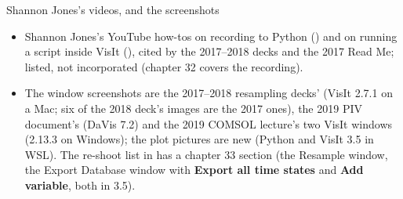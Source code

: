 \documentclass[aspectratio=169,11pt]{beamer}
\newcommand{\gui}[1]{\textsf{\textbf{#1}}}
\begin{document}
\begin{frame}{Shannon Jones's videos, and the screenshots}
\label{fr:screenshots}
\small
\begin{itemize}
  \item Shannon Jones's YouTube how-tos on recording to Python () and on running a script inside VisIt (), cited by the 2017--2018 decks and the 2017 Read Me; listed, not incorporated (chapter 32 covers the recording).
  \item The window screenshots are the 2017--2018 resampling decks' (VisIt 2.7.1 on a Mac; six of the 2018 deck's images are the 2017 ones), the 2019 PIV document's (DaVis 7.2) and the 2019 COMSOL lecture's two VisIt windows (2.13.3 on Windows); the plot pictures are new (Python and VisIt 3.5 in WSL). The re-shoot list in  has a chapter 33 section (the Resample window, the Export Database window with \gui{Export all time states} and \gui{Add variable}, both in 3.5).
\end{itemize}
\end{frame}
\end{document}

